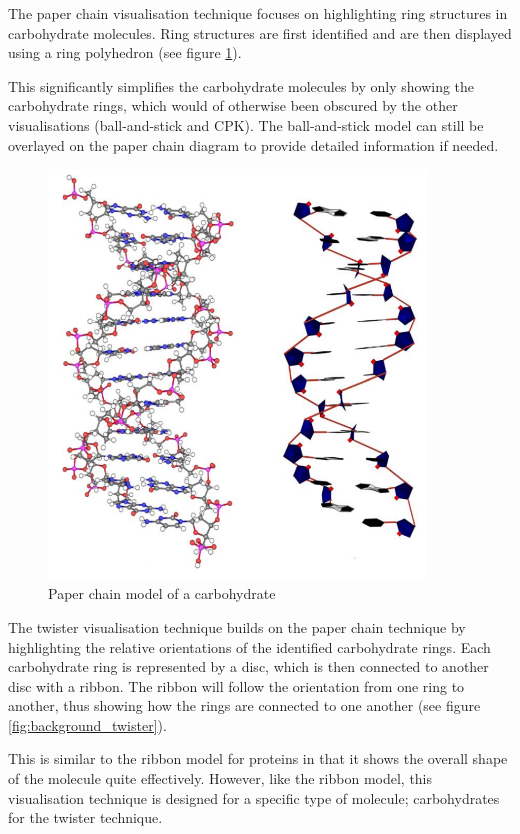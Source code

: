 The paper chain visualisation technique \citep{kuttel06} focuses on
highlighting ring structures in carbohydrate molecules. Ring structures are
first identified and are then displayed using a ring polyhedron (see figure
\ref{fig:background_paperchain}).

This significantly simplifies the carbohydrate molecules by only showing the
carbohydrate rings, which would of otherwise been obscured by the other
visualisations (ball-and-stick and CPK). The ball-and-stick model can still be
overlayed on the paper chain diagram to provide detailed information if needed.

\begin{figure}[h!]
  \begin{center}
    \includegraphics[width=100mm]{paper_chain}
  \end{center}
  \caption{Paper chain model of a carbohydrate}
  \label{fig:background_paperchain}
\end{figure}

The twister visualisation technique \citep{kuttel06} builds on the paper chain
technique by highlighting the relative orientations of the identified
carbohydrate rings. Each carbohydrate ring is represented by a disc, which is
then connected to another disc with a ribbon. The ribbon will follow the
orientation from one ring to another, thus showing how the rings are connected
to one another (see figure \ref{fig:background_twister}).

This is similar to the ribbon model for proteins in that it shows the overall
shape of the molecule quite effectively. However, like the ribbon model, this
visualisation technique is designed for a specific type of molecule;
carbohydrates for the twister technique.

